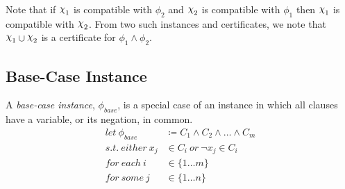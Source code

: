 Note that if $\rchi_1$ is compatible with $\phi_2$ and $\rchi_2$ is compatible with $\phi_1$ then $\rchi_1$ is compatible with $\rchi_2$.
From two such instances and certificates, we note that $\rchi_1 \cup \rchi_2$ is a certificate for $\phi_1 \land \phi_2$.


\subsection{Base-Case Instance}
\label{subsec:base-case-instance}

A \textit{base-case instance}, $\phi_{base}$, is a special case of an instance in which all clauses have a variable, or its negation, in common.
\begin{align*}
    let~ \phi_{base} & \coloneqq C_1 \land C_2 \land \ldots \land C_m \\
    s.t.~ either~ x_j & \in C_i~ or~ \lnot x_j \in C_i \\
    for~ each~ i & \in \{ 1 \dots m \} \\
    for~ some~ j & \in \{ 1 \dots n \}
\end{align*}

\begin{comment}
    Cascade of assignments:
        Assignments made due to Unit Clauses and Pure Literals.
        Cascades can be chained, e.g. assigning a Unit Clause may cause the formation of other unit clauses.
        A chain of cascades is also a cascade.

    Certificate:
        A set of assignments for variables s.t. the rest of the SAT instance is satisfied by a cascade.

    Min-Certificate:
        A smallest set of assignments for variables s.t. the rest of the SAT instance is satisfied by a cascade.

    Flattened Certificate:
        The complete set of assignments, both chosen and those by cascade.

    Compatibility:
        Two certificates are compatible if there are no conflicts between their flattened versions.

    Applying a Certificate:
        Setting variables as per the certificate and also following the resulting cascade.

    Combining two certificates:
        Two certificates can be combined if they are compatible.
        The combined certificate is the union of assignments made by choice in either certificate.

\end{comment}
